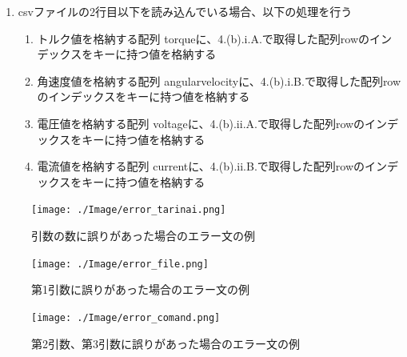 \begin{enumerate}
\begin{enumerate}
        \item csvファイルの2行目以下を読み込んでいる場合、以下の処理を行う
        \begin{enumerate}
            \item トルク値を格納する配列 torqueに、4.(b).i.A.で取得した配列rowのインデックスをキーに持つ値を格納する
            \item 角速度値を格納する配列 angularvelocityに、4.(b).i.B.で取得した配列rowのインデックスをキーに持つ値を格納する
            \item 電圧値を格納する配列 voltageに、4.(b).ii.A.で取得した配列rowのインデックスをキーに持つ値を格納する
            \item 電流値を格納する配列 currentに、4.(b).ii.B.で取得した配列rowのインデックスをキーに持つ値を格納する
        \end{enumerate}
    \end{enumerate}

\end{enumerate}
\begin{figure}[t]
	\centering
	\texttt{[image: ./Image/error\_tarinai.png]}
	\caption{引数の数に誤りがあった場合のエラー文の例}
	\label{fig:error_hikisuu}
\end{figure}
\begin{figure}[t]
	\centering
	\texttt{[image: ./Image/error\_file.png]}
	\caption{第1引数に誤りがあった場合のエラー文の例}
	\label{fig:error_file}
\end{figure}
\begin{figure}[t]
	\centering
	\texttt{[image: ./Image/error\_comand.png]}
	\caption{第2引数、第3引数に誤りがあった場合のエラー文の例}
	\label{fig:error_comand}
\end{figure}

